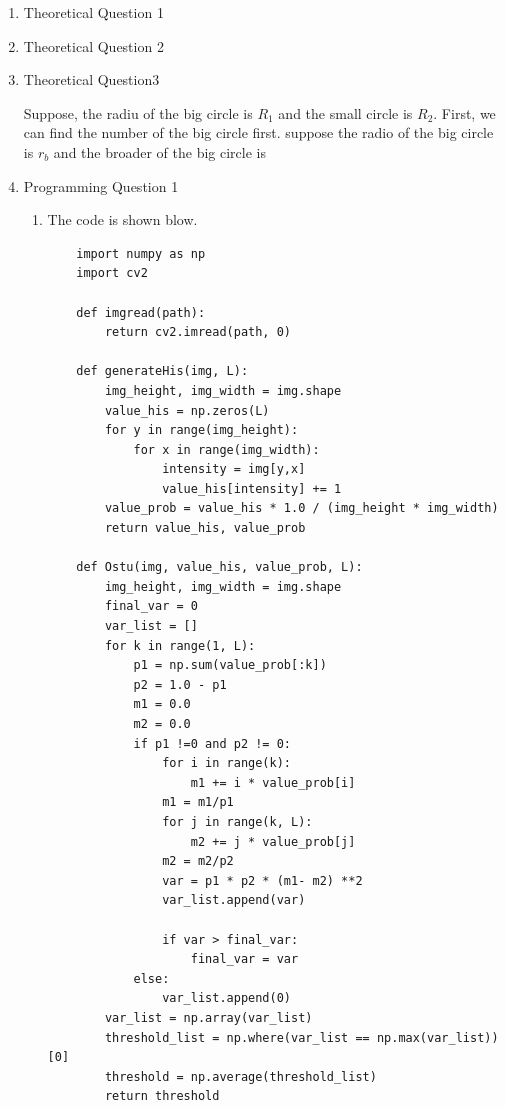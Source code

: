 \documentclass[12pt]{article}
\begin{document}
\begin{enumerate}[leftmargin=\labelsep]
\item Theoretical Question 1

\item Theoretical Question 2

\item Theoretical Question3

Suppose, the radiu of the big circle is $R_1$ and the small circle is $R_2$.
First, we can find the number of the big circle first.
suppose the radio of the big circle is $r_b$ and the broader of the big circle is 



\item Programming Question 1 
\begin{enumerate}
\item The code is shown blow.
\begin{lstlisting}
    import numpy as np
    import cv2

    def imgread(path):
        return cv2.imread(path, 0)

    def generateHis(img, L):
        img_height, img_width = img.shape
        value_his = np.zeros(L)
        for y in range(img_height):
            for x in range(img_width):
                intensity = img[y,x]
                value_his[intensity] += 1
        value_prob = value_his * 1.0 / (img_height * img_width)
        return value_his, value_prob

    def Ostu(img, value_his, value_prob, L):
        img_height, img_width = img.shape
        final_var = 0
        var_list = []
        for k in range(1, L):
            p1 = np.sum(value_prob[:k])
            p2 = 1.0 - p1
            m1 = 0.0
            m2 = 0.0
            if p1 !=0 and p2 != 0:
                for i in range(k):
                    m1 += i * value_prob[i]
                m1 = m1/p1
                for j in range(k, L):
                    m2 += j * value_prob[j]
                m2 = m2/p2
                var = p1 * p2 * (m1- m2) **2
                var_list.append(var)

                if var > final_var:
                    final_var = var
            else:
                var_list.append(0)
        var_list = np.array(var_list)
        threshold_list = np.where(var_list == np.max(var_list))[0]
        threshold = np.average(threshold_list)
        return threshold


\end{lstlisting}
\end{enumerate}
\end{enumerate}
\end{document}
